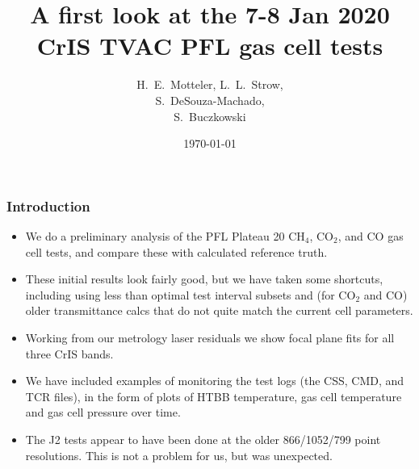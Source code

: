\documentclass[10pt]{beamer}
\title{A first look at the 7-8 Jan 2020\\
  CrIS TVAC PFL gas cell tests}
\author{H.~E.~Motteler, L.~L.~Strow, \\
  S.~DeSouza-Machado, \\
  S.~Buczkowski
}
\institute{
  UMBC Atmospheric Spectroscopy Lab \\
  Joint Center for Earth Systems Technology \\
}
\date{\today}
\begin{document}
\begin{frame}[plain]
\titlepage
\end{frame}
\begin{frame}
\frametitle{Introduction}
\begin{itemize}

  \item We do a preliminary analysis of the PFL Plateau 20 CH$_4$,
    CO$_2$, and CO gas cell tests, and compare these with calculated
    reference truth.

  \item These initial results look fairly good, but we have taken
    some shortcuts, including using less than optimal test interval
    subsets and (for CO$_2$ and CO) older transmittance calcs that do
    not quite match the current cell parameters.
 
  \item Working from our metrology laser residuals we show focal
    plane fits for all three CrIS bands.

  \item We have included examples of monitoring the test logs
    (the CSS, CMD, and TCR files), in the form of plots of HTBB
    temperature, gas cell temperature and gas cell pressure over
    time.

  \item The J2 tests appear to have been done at the older
    866/1052/799 point resolutions.  This is not a problem for us,
    but was unexpected.
    
\end{itemize}
\end{frame}
\end{document}
